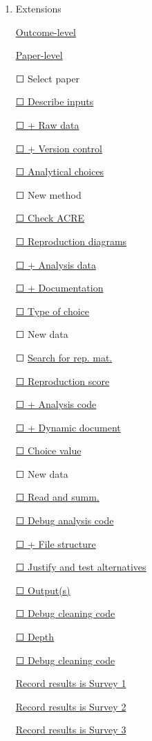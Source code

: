 \documentclass[]{book}
\providecommand{\tightlist}{%
  \setlength{\itemsep}{0pt}\setlength{\parskip}{0pt}}
\begin{document}
\begin{enumerate}
\def\labelenumi{(\arabic{enumi})}
\setcounter{enumi}{4}
\tightlist
\item
   Extensions

  \protect\hyperlink{improvements}{Outcome-level}

  \protect\hyperlink{paper-level}{Paper-level}

  ☐ Select paper

  \protect\hyperlink{describe-inputs}{☐ Describe inputs}

  \protect\hyperlink{rd}{☐ + Raw data}

  \protect\hyperlink{paper-level}{☐ + Version control}

  \protect\hyperlink{id-analy}{☐ Analytical choices}

  ☐ New method

  \protect\hyperlink{check-acre}{☐ Check ACRE}

  \protect\hyperlink{diagram}{☐ Reproduction diagrams}

  \protect\hyperlink{ad}{☐ + Analysis data}

  \protect\hyperlink{paper-level}{☐ + Documentation}

  \protect\hyperlink{id-type}{☐ Type of choice}

  ☐ New data

  ☐ \protect\hyperlink{verify-rep-mat}{Search for rep. mat.}

  \protect\hyperlink{score}{☐ Reproduction score}

  \protect\hyperlink{ac}{☐ + Analysis code}

  \protect\hyperlink{paper-level}{☐ + Dynamic document}

  \protect\hyperlink{id-val}{☐ Choice value}

  ☐ New data

  \protect\hyperlink{read-summ}{☐ Read and summ.}

  \protect\hyperlink{dac}{☐ Debug analysis code}

  \protect\hyperlink{paper-level}{☐ + File structure}

  \protect\hyperlink{test-rob}{☐ Justify and test alternatives}

  \protect\hyperlink{outputs}{☐ Output(s)}

  \protect\hyperlink{dcc}{☐ Debug cleaning code}

  \protect\hyperlink{intensive}{☐ Depth}

  \protect\hyperlink{dcc}{☐ Debug cleaning code}

  \href{https://berkeley.qualtrics.com/jfe/form/SV_3UWe5xu3qjeh0c5}{Record results is Survey 1}

  \href{https://berkeley.qualtrics.com/jfe/form/SV_2gd9Y3XVtjLpZL7}{Record results is Survey 2}

  \href{ADD\%20LINK}{Record results is Survey 3}
\end{enumerate}
\end{document}
